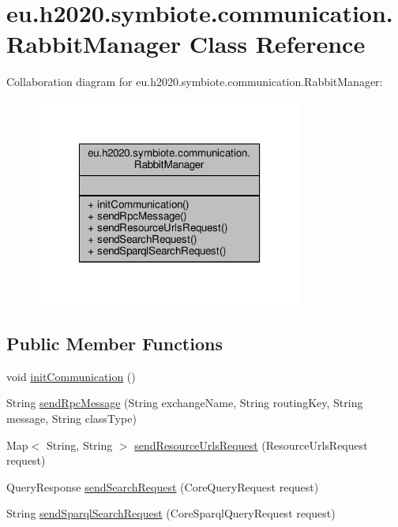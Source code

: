 \hypertarget{classeu_1_1h2020_1_1symbiote_1_1communication_1_1RabbitManager}{}\section{eu.\+h2020.\+symbiote.\+communication.\+Rabbit\+Manager Class Reference}
\label{classeu_1_1h2020_1_1symbiote_1_1communication_1_1RabbitManager}


Collaboration diagram for eu.\+h2020.\+symbiote.\+communication.\+Rabbit\+Manager\+:
\nopagebreak
\begin{figure}[H]
\begin{center}
\leavevmode
\includegraphics[width=250pt]{classeu_1_1h2020_1_1symbiote_1_1communication_1_1RabbitManager__coll__graph}
\end{center}
\end{figure}
\subsection*{Public Member Functions}
\begin{DoxyCompactItemize}
\item 
void \hyperlink{classeu_1_1h2020_1_1symbiote_1_1communication_1_1RabbitManager_a30abf6a670122eb22a8105a206858616}{init\+Communication} ()
\item 
String \hyperlink{classeu_1_1h2020_1_1symbiote_1_1communication_1_1RabbitManager_a9c71bf18d0bf371fd35c977a69861855}{send\+Rpc\+Message} (String exchange\+Name, String routing\+Key, String message, String class\+Type)
\item 
Map$<$ String, String $>$ \hyperlink{classeu_1_1h2020_1_1symbiote_1_1communication_1_1RabbitManager_a56ce4aea24a797b642a52a3071acf0cb}{send\+Resource\+Urls\+Request} (Resource\+Urls\+Request request)
\item 
Query\+Response \hyperlink{classeu_1_1h2020_1_1symbiote_1_1communication_1_1RabbitManager_a5b92c55b2c12067f60f030f6fdabb685}{send\+Search\+Request} (Core\+Query\+Request request)
\item 
String \hyperlink{classeu_1_1h2020_1_1symbiote_1_1communication_1_1RabbitManager_a33cffe584ceba766deba679997ca68a4}{send\+Sparql\+Search\+Request} (Core\+Sparql\+Query\+Request request)
\end{DoxyCompactItemize}


